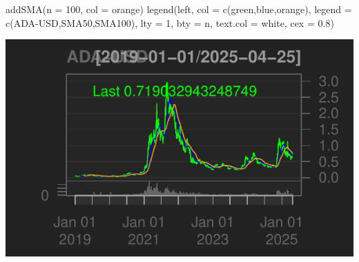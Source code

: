 \documentclass[]{tufte-handout}
\newenvironment{Shaded}{}{}
\newcommand{\AttributeTok}[1]{\textcolor[rgb]{0.49,0.56,0.16}{#1}}
\newcommand{\DecValTok}[1]{\textcolor[rgb]{0.25,0.63,0.44}{#1}}
\newcommand{\FloatTok}[1]{\textcolor[rgb]{0.25,0.63,0.44}{#1}}
\newcommand{\FunctionTok}[1]{\textcolor[rgb]{0.02,0.16,0.49}{#1}}
\newcommand{\NormalTok}[1]{#1}
\newcommand{\OtherTok}[1]{\textcolor[rgb]{0.00,0.44,0.13}{#1}}
\newcommand{\SpecialCharTok}[1]{\textcolor[rgb]{0.25,0.44,0.63}{#1}}
\newcommand{\StringTok}[1]{\textcolor[rgb]{0.25,0.44,0.63}{#1}}
\begin{document}
\begin{Shaded}
\begin{Highlighting}[]
\FunctionTok{addSMA}\NormalTok{(}\AttributeTok{n =} \DecValTok{100}\NormalTok{, }\AttributeTok{col =} \StringTok{\textquotesingle{}orange\textquotesingle{}}\NormalTok{)}
\FunctionTok{legend}\NormalTok{(}\StringTok{\textquotesingle{}left\textquotesingle{}}\NormalTok{, }\AttributeTok{col =} \FunctionTok{c}\NormalTok{(}\StringTok{\textquotesingle{}green\textquotesingle{}}\NormalTok{,}\StringTok{\textquotesingle{}blue\textquotesingle{}}\NormalTok{,}\StringTok{\textquotesingle{}orange\textquotesingle{}}\NormalTok{),}
       \AttributeTok{legend =} \FunctionTok{c}\NormalTok{(}\StringTok{\textquotesingle{}ADA{-}USD\textquotesingle{}}\NormalTok{,}\StringTok{\textquotesingle{}SMA50\textquotesingle{}}\NormalTok{,}\StringTok{\textquotesingle{}SMA100\textquotesingle{}}\NormalTok{), }\AttributeTok{lty =} \DecValTok{1}\NormalTok{, }\AttributeTok{bty =} \StringTok{\textquotesingle{}n\textquotesingle{}}\NormalTok{,}
       \AttributeTok{text.col =} \StringTok{\textquotesingle{}white\textquotesingle{}}\NormalTok{, }\AttributeTok{cex =} \FloatTok{0.8}\NormalTok{)}
\end{Highlighting}
\end{Shaded}

\includegraphics{cripto_update_files/figure-latex/unnamed-chunk-7-3}

\begin{Shaded}
\end{Shaded}
\end{document}

